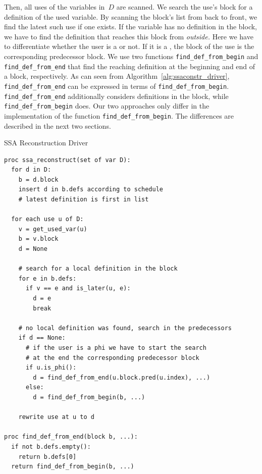 Then, all uses of the variables in~$D$ are scanned.
We search the use's block for a definition of the used variable.
By scanning the block's list from back to front, we find the latest such use if one exists. 
If the variable has no definition in the block, we have to find the definition that reaches this block from \emph{outside.}
Here we have to differentiate whether the user is a \phifun or not.
If it is a \phifun, the block of the use is the corresponding predecessor block.
We use two functions \verb|find_def_from_begin| and \verb|find_def_from_end| that find the reaching definition at the beginning and end of a block, respectively. 
As can seen from Algorithm~\ref{alg:ssaconstr_driver}, \verb|find_def_from_end| can be expressed in terms of \verb|find_def_from_begin|. 
\verb|find_def_from_end| additionally considers definitions in the block, while \verb|find_def_from_begin| does.
Our two approaches only differ in the implementation of the function \verb|find_def_from_begin|.
The differences are described in the next two sections.
\begin{algorithm}
	\caption{SSA Reconstruction Driver}
	\label{alg:ssaconstr_driver}

\begin{verbatim}
proc ssa_reconstruct(set of var D):
  for d in D:
    b = d.block
    insert d in b.defs according to schedule
    # latest definition is first in list

  for each use u of D:
    v = get_used_var(u)
    b = v.block
    d = None

    # search for a local definition in the block
    for e in b.defs:
      if v == e and is_later(u, e):
        d = e
        break
        
    # no local definition was found, search in the predecessors
    if d == None:
      # if the user is a phi we have to start the search 
      # at the end the corresponding predecessor block 
      if u.is_phi():
        d = find_def_from_end(u.block.pred(u.index), ...)
      else:
        d = find_def_from_begin(b, ...)

    rewrite use at u to d

proc find_def_from_end(block b, ...):
  if not b.defs.empty():
    return b.defs[0]
  return find_def_from_begin(b, ...)
\end{verbatim}
\end{algorithm}

